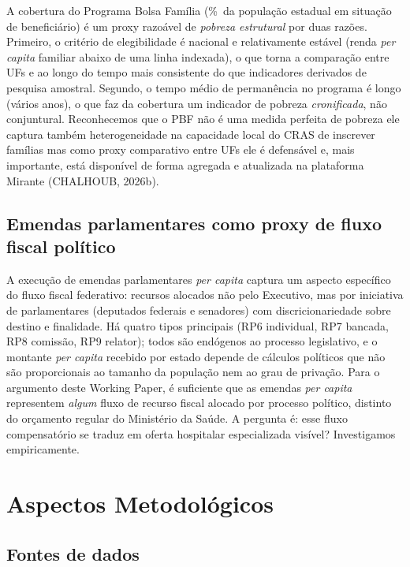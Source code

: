 \documentclass[12pt,a4paper,oneside]{article}
\begin{document}
A cobertura do Programa Bolsa Família (\%~da população estadual
em situação de beneficiário) é um proxy razoável de
\textit{pobreza estrutural} por duas razões. Primeiro, o
critério de elegibilidade é nacional e relativamente estável
(renda \textit{per capita} familiar abaixo de uma linha
indexada), o que torna a comparação entre UFs e ao longo do
tempo mais consistente do que indicadores derivados de pesquisa
amostral. Segundo, o tempo médio de permanência no programa é
longo (vários anos), o que faz da cobertura um indicador de
pobreza \textit{cronificada}, não conjuntural. Reconhecemos que
o PBF não é uma medida perfeita de pobreza \textemdash{} ele
captura também heterogeneidade na capacidade local do CRAS de
inscrever famílias \textemdash{} mas como proxy comparativo
entre UFs ele é defensável e, mais importante, está disponível
de forma agregada e atualizada na plataforma Mirante (CHALHOUB,
2026b).

\subsection{Emendas parlamentares como proxy de fluxo fiscal
político}

A execução de emendas parlamentares \textit{per capita} captura
um aspecto específico do fluxo fiscal federativo: recursos
alocados não pelo Executivo, mas por iniciativa de
parlamentares (deputados federais e senadores) com
discricionariedade sobre destino e finalidade. Há quatro tipos
principais (RP6 individual, RP7 bancada, RP8 comissão, RP9
relator); todos são endógenos ao processo legislativo, e o
montante \textit{per capita} recebido por estado depende de
cálculos políticos que não são proporcionais ao tamanho da
população nem ao grau de privação. Para o argumento deste
Working Paper, é suficiente que as emendas \textit{per capita}
representem \textit{algum} fluxo de recurso fiscal alocado por
processo político, distinto do orçamento regular do Ministério
da Saúde. A pergunta é: esse fluxo compensatório se traduz em
oferta hospitalar especializada visível? Investigamos
empiricamente.

\section{Aspectos Metodológicos}\label{sec:metodo}

\subsection{Fontes de dados}
\end{document}

